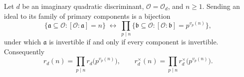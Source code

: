 %
%

\begin{proposition}
  \label{infra-glue-primary}
  Let $d$ be an imaginary quadratic discriminant, $\mathcal{O} = \mathcal{O}_d$,
  and $n \geq 1$. Sending an ideal to its family of primary components is a
  bijection
  \[
    \{\mathfrak{a} \subseteq \mathcal{O} : [\mathcal{O} : \mathfrak{a}] = n\}
    \;\longleftrightarrow\;
    \prod_{p \mid n}
    \{\mathfrak{b} \subseteq \mathcal{O} : [\mathcal{O} : \mathfrak{b}] = p^{v_p(n)}\},
  \]
  under which $\mathfrak{a}$ is invertible if and only if every component is
  invertible. Consequently
  \[
    r_d(n) = \prod_{p \mid n} r_d\bigl(p^{v_p(n)}\bigr),
    \qquad
    r_d^{\times}(n) = \prod_{p \mid n} r_d^{\times}\bigl(p^{v_p(n)}\bigr).
  \]
\end{proposition}

